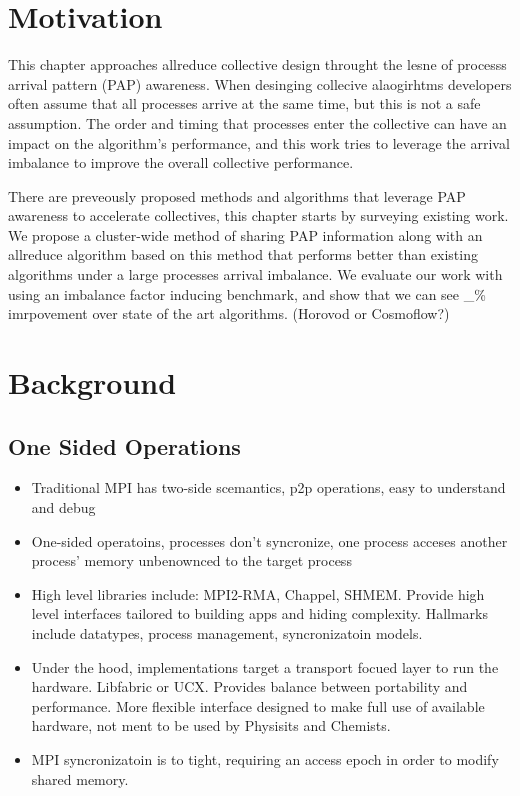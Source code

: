 \section{Motivation}

This chapter approaches allreduce collective design throught the lesne of processs arrival pattern (PAP) awareness. 
When desinging collecive alaogirhtms developers often assume that all processes arrive at the same time, but this is not a safe assumption.
The order and timing that processes enter the collective can have an impact on the algorithm's performance, and this work tries to leverage the arrival imbalance to improve the overall collective performance.

There are preveously proposed methods and algorithms that leverage PAP awareness to accelerate collectives, this chapter starts by surveying existing work.
We propose a cluster-wide method of sharing PAP information along with an allreduce algorithm based on this method that performs better than existing algorithms under a large processes arrival imbalance.
We evaluate our work with using an imbalance factor inducing benchmark, and show that we can see \_\% imrpovement over state of the art algorithms.  
(Horovod or Cosmoflow?)

\section{Background}

\subsection{One Sided Operations}

\begin{itemize}
    \item Traditional MPI has two-side scemantics, p2p operations, easy to understand and debug
    \item One-sided operatoins, processes don't syncronize, one process acceses another process' memory unbenownced to the target process
    \item High level libraries include: MPI2-RMA, Chappel, SHMEM. Provide high level interfaces tailored to building apps and hiding complexity. Hallmarks include datatypes, process management, syncronizatoin models.
    \item Under the hood, implementations target a transport focued layer to run the hardware. Libfabric or UCX. Provides balance between portability and performance. More flexible interface designed to make full use of available hardware, not ment to be used by Physisits and Chemists.
    \item MPI syncronizatoin is to tight, requiring an access epoch in order to modify shared memory.
    
\end{itemize}



